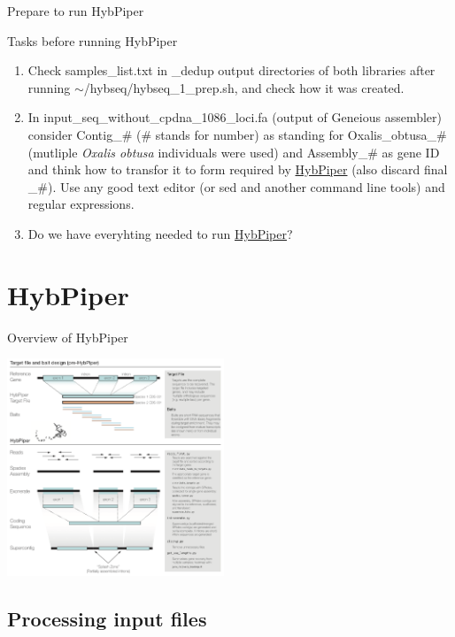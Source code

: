 \documentclass[compress, ucs, xelatex, 11pt, xcolor=x11names, aspectratio=169,
	hyperref={
		bookmarks=true,
		unicode=true,
		colorlinks=true,
		pdftitle={HybSeq course},
		plainpages=false,
		pdfauthor={Vojtech Zeisek},
		pdfsubject={Practical processing of HybSeq target enrichment sequencing data on computing grids like MetaCentrum},
		pdfcreator={XeLaTeX},
		pdfkeywords={BASH, command line, GNU, HybSeq, Linux, MetaCentrum, sequencing shell, target enrichment},
		linkcolor=Cyan2, %
		anchorcolor=Firebrick2, %
		citecolor=Firebrick2, %
		filecolor=Firebrick2, %
		menucolor=Firebrick2, %
		urlcolor=Chartreuse2, %
		pdftex},
	url={hyphens, lowtilde} %
	]{beamer}
\renewcommand{\texttt}[1]{\colorbox{Snow4}{{\ttfamily #1}}}
\begin{document}
\begin{frame}{Prepare to run HybPiper}
	\begin{exampleblock}{Tasks before running HybPiper}
		\begin{enumerate}
			\item Check \texttt{samples\_list.txt} in \texttt{2\_dedup} output directories of both libraries after running \texttt{$\sim$/hybseq/hybseq\_1\_prep.sh}, and check how it was created.
			\item In \texttt{input\_seq\_without\_cpdna\_1086\_loci.fa} (output of Geneious assembler) consider \texttt{Contig\_\#} (\texttt{\#} stands for number) as standing for \texttt{Oxalis\_obtusa\_\#} (mutliple \textit{Oxalis obtusa} individuals were used) and \texttt{Assembly\_\#} as gene ID and think how to transfor it to form required by \href{https://github.com/mossmatters/HybPiper/wiki\#target-file}{HybPiper} (also discard final \texttt{\_\#}). Use any good text editor (or \texttt{sed} and another command line tools) and regular expressions.
			\item Do we have everyhting needed to run \href{https://github.com/mossmatters/HybPiper}{HybPiper}?
		\end{enumerate}
	\end{exampleblock}
\end{frame}

\section{HybPiper}

\begin{frame}{Overview of HybPiper}
	\begin{center}
		\includegraphics[height=6.5cm]{hybpiper.png}
	\end{center}
\end{frame}

\subsection{Processing input files}
\end{document}
